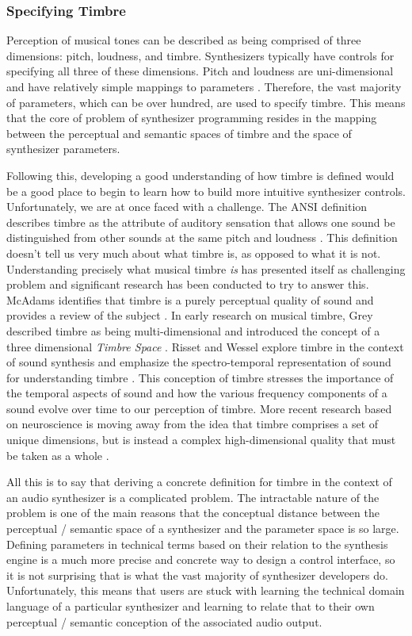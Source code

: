 \subsubsection{Specifying Timbre}
Perception of musical tones can be described as being comprised of three dimensions: pitch, loudness, and timbre. Synthesizers typically have controls for specifying all three of these dimensions. Pitch and loudness are uni-dimensional and have relatively simple mappings to parameters \cite{seago2004critical}. Therefore, the vast majority of parameters, which can be over hundred, are used to specify timbre. This means that the core of problem of synthesizer programming resides in the mapping between the perceptual and semantic spaces of timbre and the space of synthesizer parameters.
 
Following this, developing a good understanding of how timbre is defined would be a good place to begin to learn how to build more intuitive synthesizer controls. Unfortunately, we are at once faced with a challenge. The ANSI definition describes timbre as the attribute of auditory sensation that allows one sound be distinguished from other sounds at the same pitch and loudness \cite{american1973american}. This definition doesn't tell us very much about what timbre is, as opposed to what it is not. Understanding precisely what musical timbre \textit{is} has presented itself as challenging problem \cite{krumhansl1989musical} and significant research has been conducted to try to answer this. McAdams identifies that timbre is a purely perceptual quality of sound and provides a review of the subject \cite{mcadams2019}. In early research on musical timbre, Grey described timbre as being multi-dimensional and introduced the concept of a three dimensional \textit{Timbre Space} \cite{grey1977multidimensional}. Risset and Wessel explore timbre in the context of sound synthesis and emphasize the spectro-temporal representation of sound for understanding timbre \cite{risset1999exploration}. This conception of timbre stresses the importance of the temporal aspects of sound and how the various frequency components of a sound evolve over time to our perception of timbre. More recent research based on neuroscience is moving away from the idea that timbre comprises a set of unique dimensions, but is instead a complex high-dimensional quality that must be taken as a whole \cite{mcadams2019}. 

All this is to say that deriving a concrete definition for timbre in the context of an audio synthesizer is a complicated problem. The intractable nature of the problem is one of the main reasons that the conceptual distance between the perceptual / semantic space of a synthesizer and the parameter space is so large. Defining parameters in technical terms based on their relation to the synthesis engine is a much more precise and concrete way to design a control interface, so it is not surprising that is what the vast majority of synthesizer developers do. Unfortunately, this means that users are stuck with learning the technical domain language of a particular synthesizer and learning to relate that to their own perceptual / semantic conception of the associated audio output.

